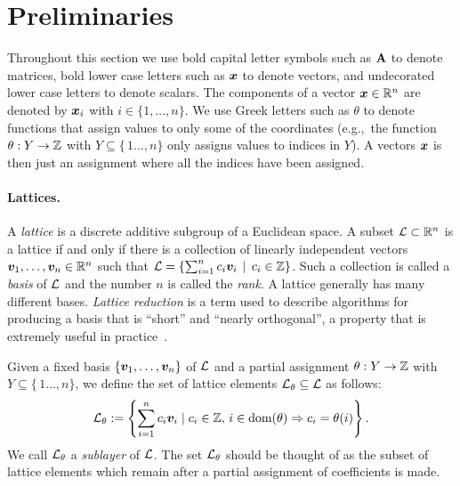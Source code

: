 \section{Preliminaries}
\label{sec:preliminaries}

\newcommand{\indices}[1]{\{\,1\ldots,#1\}}

Throughout this section we use bold capital letter symbols such as
$\mathbf{A}$ to denote matrices,
bold lower case letters such as $\boldsymbol{x}$ to denote vectors,
and undecorated lower case letters to denote scalars.  The components of a
vector $\boldsymbol{x} \in \mathbb{R}^n$ are denoted by $\boldsymbol{x}_i$ with $i \in \{1,\ldots,n\}$.
%
We use Greek letters such as $\theta$ to denote functions that assign values
to only some of the coordinates (e.g.,~the function $\theta : Y \to \mathbb{Z}$ with
$Y \subseteq \indices{n}$ only assigns values to indices in $Y$).
%
A vectors $\boldsymbol{x}$ is then just an assignment where all the indices have
been assigned.

\paragraph{Lattices.} A \emph{lattice} is a discrete additive subgroup of a
Euclidean space. A subset $\mathcal{L} \subset \mathbb{R}^n$ is a lattice if and only if
there is a collection of linearly independent vectors $\boldsymbol{v}_1, \ldots,
\boldsymbol{v}_n \in \mathbb{R}^n$ such that
$\mathcal{L} = \left\{ \sum_{i=1}^n c_i \boldsymbol{v}_i \, \mid \, c_i \in \mathbb{Z} \right\}$.
%
Such a collection is called a \emph{basis} of
$\mathcal{L}$ and the number $n$ is called the \emph{rank}.
%
A lattice generally has many different bases.
%
\emph{Lattice reduction} is a term used to describe
algorithms for producing a basis that is ``short'' and ``nearly orthogonal'',
a property that is extremely useful in practice~\cite{Lenstra}.

Given a fixed basis $\{\boldsymbol{v}_1, \ldots, \boldsymbol{v}_n\}$ of $\mathcal{L}$ and a partial
assignment $\theta : Y \to \mathbb{Z}$ with $Y \subseteq \indices{n}$,
we define the set of lattice elements $\mathcal{L}_\theta \subseteq \mathcal{L}$ as follows:
%
\begin{equation}
     \label{eq:lat-sublayer}
     \mathcal{L}_\theta := \left\{ \sum_{i=1}^n c_i \boldsymbol{v}_i \mid c_i \in \mathbb{Z}, \,
         i \in \mathrm{dom}(\theta) \Rightarrow c_i = \theta(i) \right\}.
\end{equation}
%
We call $\mathcal{L}_\theta$ a \emph{sublayer} of $\mathcal{L}$.  The set $\mathcal{L}_\theta$ should be thought
of as the subset of lattice elements which remain after a partial assignment
of coefficients is made.

